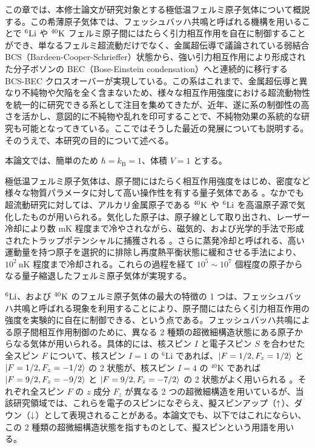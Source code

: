 
この章では、本修士論文が研究対象とする極低温フェルミ原子気体について概説する。この希薄原子気体では、フェッシュバッハ共鳴と呼ばれる機構を用いることで ${}^6\mathrm{Li}$ や ${}^{40}\mathrm{K}$ フェルミ原子間にはたらく引力相互作用を自在に制御することができ、単なるフェルミ超流動だけでなく、金属超伝導で議論されている弱結合 BCS（Bardeen-Cooper-Schrieffer）状態から、強い引力相互作用により形成された分子ボソンの BEC（Bose-Einstein condensation）へと連続的に移行する BCS-BEC クロスオーバーが実現している。この系はこれまで、金属超伝導と異なり不純物や欠陥を全く含まないため、様々な相互作用強度における超流動物性を統一的に研究できる系として注目を集めてきたが、近年、遂に系の制御性の高さを活かし、意図的に不純物や乱れを印可することで、不純物効果の系統的な研究も可能となってきている。ここではそうした最近の発展についても説明する。そのうえで、本研究の目的について述べる。

本論文では、簡単のため $\hbar=k_{\text{B}}=1$、体積 $V=1$ とする。
 

極低温フェルミ原子気体は、原子間にはたらく相互作用強度をはじめ、密度など様々な物質パラメータに対して高い操作性を有する量子気体である \cite{giorgini2008,bloch2008,ketterle2008}。なかでも超流動研究に対しては、アルカリ金属原子である ${}^{40}\mathrm{K}$ や ${}^6\mathrm{Li}$ を高温原子源で気化したものが用いられる。気化した原子は、原子線として取り出され、レーザー冷却により数 $\mathrm{mK}$ 程度まで冷やされながら、磁気的、および光学的手法で形成されたトラップポテンシャルに捕獲される \cite{ketterle2008}。さらに蒸発冷却と呼ばれる、高い運動量を持つ原子を選択的に排除し再度熱平衡状態に緩和させる手法により、$10^2\ \mathrm{nK}$ 程度まで冷却される。これらの過程を経て $10^5 \sim 10^7$ 個程度の原子からなる量子縮退したフェルミ原子気体が実現する。


${}^6\mathrm{Li}$、および ${}^{40}\mathrm{K}$ のフェルミ原子気体の最大の特徴の 1 つは、フェッシュバッハ共鳴と呼ばれる現象を利用することにより、原子間にはたらく引力相互作用の強度を実験的に自在に制御できる、という点である。フェッシュバッハ共鳴による原子間相互作用制御のために、異なる 2 種類の超微細構造状態にある原子からなる気体が用いられる。具体的には、核スピン $I$ と電子スピン $S$ を合わせた全スピン $F$ について、核スピン $I=1$ の ${}^{6}\mathrm{Li}$ であれば、$\ket{F=1/2, F_z=1/2}$ と $
\ket{F=1/2, F_z=-1/2}$ の 2 状態が、核スピン $I=4$ の ${}^{40}\mathrm{K}$ であれば $\ket{F=9/2, F_z=-9/2}$ と $\ket{F=9/2, F_z=-7/2}$ の 2 状態がよく用いられる \cite{chin2010}。それぞれ全スピン $F$ の $z$ 成分 $F_z$ が異なる 2 つの超微細構造を用いているが、当該研究領域では、これらを電子のスピンになぞらえ、擬スピンアップ（$\uparrow$）、ダウン（$\downarrow$）として表現されることがある。本論文でも、以下ではこれにならい、この 2 種類の超微細構造状態を指すものとして、擬スピンという用語を用いる。

